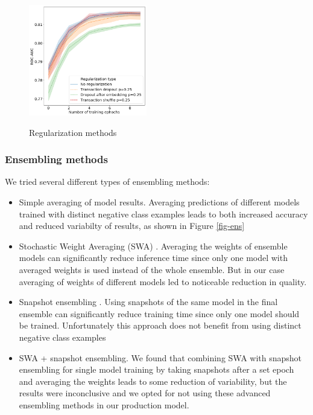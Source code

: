 \documentclass[sigconf]{acmart}
\begin{document}
\begin{figure}[ht]
  \caption{Regularization methods}
  \includegraphics[width=0.46\textwidth]{figures/do-pic.png}
  \label{fig-reg}
\end{figure}


\subsubsection{Ensembling methods} \label{sec-ens}

We tried several different types of ensembling methods:
\begin{itemize}
\item Simple averaging of model results. Averaging predictions of different models trained with distinct negative class examples leads to both increased accuracy and reduced variabilty of results, as shown in Figure \ref{fig-ens}
\item Stochastic Weight Averaging (SWA) \cite{DBLP:journals/corr/LoshchilovH16a}.  Averaging the weights of ensemble models can significantly reduce inference time since only one model with averaged weights is used instead of the whole ensemble. But in our case averaging of weights of different models led to noticeable reduction in quality.
\item Snapshot ensembling \cite{DBLP:journals/corr/HuangLPLHW17}. Using snapshots of the same model in the final ensemble can significantly reduce training time since only one model should be trained. Unfortunately this approach does not benefit from using distinct negative class examples
\item SWA + snapshot ensembling. We found that combining SWA with snapshot ensembling for single model training by taking snapshots after a set epoch and averaging the weights leads to some reduction of variability, but the results were inconclusive and we opted for not using these advanced ensembling methods in our production model.
\end{itemize}
\end{document}
